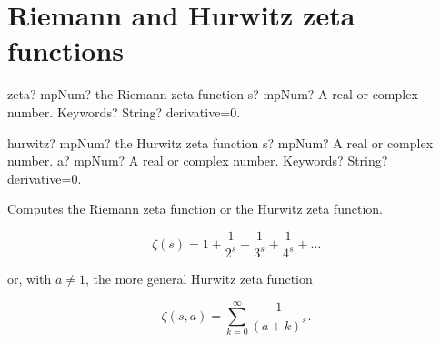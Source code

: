 %
%
%
%
%
%
%
%


\section{Riemann and Hurwitz zeta functions}

\begin{mpFunctionsExtract}
	\mpFunctionTwo
	{zeta? mpNum? the Riemann zeta function}
	{s? mpNum? A real or complex number.}
	{Keywords? String? derivative=0.}	
\end{mpFunctionsExtract}


\vspace{0.6cm}

\begin{mpFunctionsExtract}
	\mpFunctionThree
	{hurwitz? mpNum? the  Hurwitz  zeta function}
	{s? mpNum? A real or complex number.}
	{a? mpNum? A real or complex number.}	
	{Keywords? String? derivative=0.}	
\end{mpFunctionsExtract}


\vpara
Computes the Riemann zeta function or the Hurwitz  zeta function.

\begin{equation}
\zeta(s) = 1+\frac{1}{2^s}+\frac{1}{3^s}+\frac{1}{4^s} + \ldots
\end{equation}

or, with $a \neq 1$, the more general Hurwitz zeta function

\begin{equation}
\zeta(s, a) = \sum_{k=0}^{\infty} \frac{1}{(a+k)^s}.
\end{equation}


